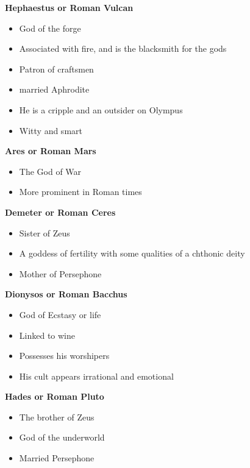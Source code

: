 \documentclass[12pt,a4paper]{report}
\begin{document}
\textbf{Hephaestus or Roman Vulcan}
\begin{itemize}
\item God of the forge
\item Associated with fire, and is the blacksmith for the gods
\item Patron of craftsmen
\item married Aphrodite
\item He is a cripple and an outsider on Olympus
\item Witty and smart
\end{itemize}

\textbf{Ares or Roman Mars}
\begin{itemize}
\item The God of War
\item More prominent in Roman times
\end{itemize}

\textbf{Demeter or Roman Ceres}
\begin{itemize}
\item Sister of Zeus
\item A goddess of fertility with some qualities of a chthonic deity
\item Mother of Persephone
\end{itemize}

\textbf{Dionysos or Roman Bacchus}
\begin{itemize}
\item God of Ecstasy or life
\item Linked to wine
\item Possesses his worshipers
\item His cult appears irrational and emotional
\end{itemize}

\textbf{Hades or Roman Pluto}
\begin{itemize}
\item The brother of Zeus
\item God of the underworld
\item Married Persephone
\end{itemize}
\end{document}
